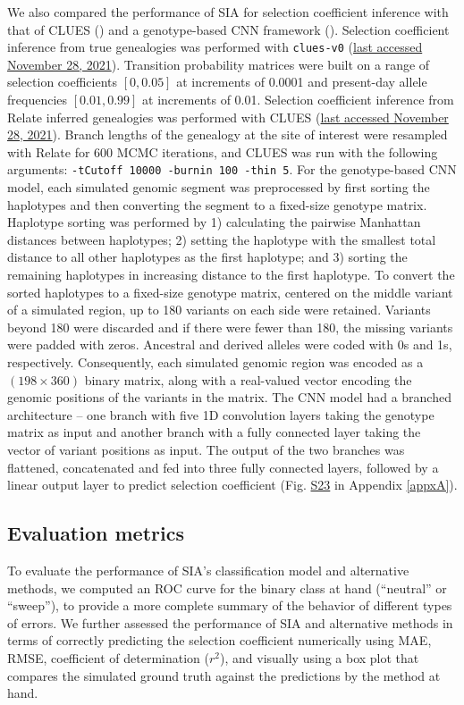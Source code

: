 We also compared the performance of \ac{SIA} for selection coefficient inference with that of CLUES (\cite{stern_approximate_2019}) and a genotype-based \ac{CNN} framework (\cite{flagel_unreasonable_2019,torada_imagene_2019}). Selection coefficient inference from true genealogies was performed with \texttt{clues-v0} (\href{https://github.com/35ajstern/clues-v0}{last accessed November 28, 2021}). Transition probability matrices were built on a range of selection coefficients $[0, 0.05]$ at increments of 0.0001 and present-day allele frequencies $[0.01, 0.99]$ at increments of 0.01. Selection coefficient inference from Relate inferred genealogies was performed with CLUES (\href{https://github.com/35ajstern/clues}{last accessed November 28, 2021}). Branch lengths of the genealogy at the site of interest were resampled with Relate for 600 \acs{MCMC} iterations, and CLUES was run with the following arguments: \texttt{-tCutoff 10000 -burnin 100 -thin 5}. For the genotype-based \ac{CNN} model, each simulated genomic segment was preprocessed by first sorting the haplotypes and then converting the segment to a fixed-size genotype matrix. Haplotype sorting was performed by 1) calculating the pairwise Manhattan distances between haplotypes; 2) setting the haplotype with the smallest total distance to all other haplotypes as the first haplotype; and 3) sorting the remaining haplotypes in increasing distance to the first haplotype. To convert the sorted haplotypes to a fixed-size genotype matrix, centered on the middle variant of a simulated region, up to 180 variants on each side were retained. Variants beyond 180 were discarded and if there were fewer than 180, the missing variants were padded with zeros. Ancestral and derived alleles were coded with 0s and 1s, respectively. Consequently, each simulated genomic region was encoded as a $(198 \times 360)$ binary matrix, along with a real-valued vector encoding the genomic positions of the variants in the matrix. The \ac{CNN} model had a branched architecture -- one branch with five 1D convolution layers taking the genotype matrix as input and another branch with a fully connected layer taking the vector of variant positions as input. The output of the two branches was flattened, concatenated and fed into three fully connected layers, followed by a linear output layer to predict selection coefficient (Fig. \href{https://academic.oup.com/mbe/article/39/1/msab332/6433161?login=true#supplementary-data}{S23} in Appendix \ref{appxA}).

\subsection{Evaluation metrics}
To evaluate the performance of \ac{SIA}’s classification model and alternative methods, we computed an \ac{ROC} curve for the binary class at hand (“neutral” or “sweep”), to provide a more complete summary of the behavior of different types of errors. We further assessed the performance of \ac{SIA} and alternative methods in terms of correctly predicting the selection coefficient numerically using \acf{MAE}, \acf{RMSE}, coefficient of determination ($r^2$), and visually using a box plot that compares the simulated ground truth against the predictions by the method at hand.

